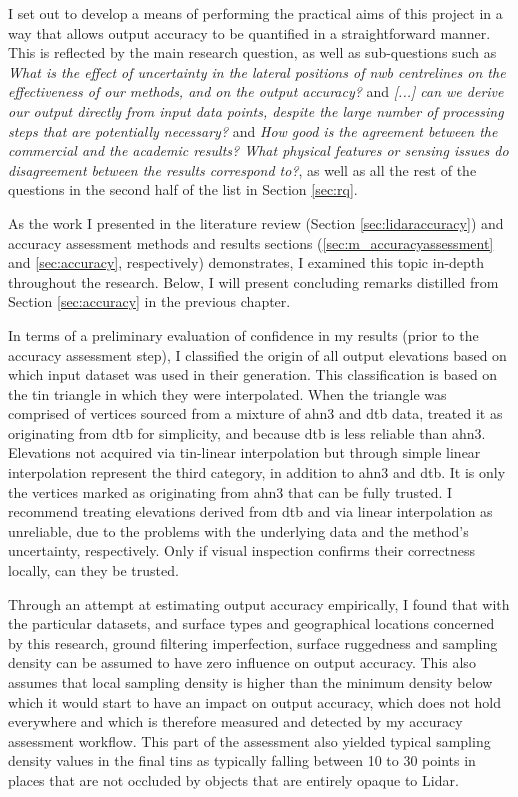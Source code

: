 I set out to develop a means of performing the practical aims of this project in a way that allows output accuracy to be quantified in a straightforward manner. This is reflected by the main research question, as well as sub-questions such as \textit{What is the effect of uncertainty in the lateral positions of \ac{nwb} centrelines on the effectiveness of our methods, and on the output accuracy?} and \textit{[...] can we derive our output directly from input data points, despite the large number of processing steps that are potentially necessary?} and \textit{How good is the agreement between the commercial and the academic results? What physical features or sensing issues do disagreement between the results correspond to?}, as well as all the rest of the questions in the second half of the list in Section \ref{sec:rq}.

As the work I presented in the literature review (Section \ref{sec:lidaraccuracy}) and accuracy assessment methods and results sections (\ref{sec:m_accuracyassessment} and \ref{sec:accuracy}, respectively) demonstrates, I examined this topic in-depth throughout the research. Below, I will present concluding remarks distilled from Section \ref{sec:accuracy} in the previous chapter.

In terms of a preliminary evaluation of confidence in my results (prior to the accuracy assessment step), I classified the origin of all output elevations based on which input dataset was used in their generation. This classification is based on the \ac{tin} triangle in which they were interpolated. When the triangle was comprised of vertices sourced from a mixture of \ac{ahn3} and \ac{dtb} data, treated it as originating from \ac{dtb} for simplicity, and because \ac{dtb} is less reliable than \ac{ahn3}. Elevations not acquired via \ac{tin}-linear interpolation but through simple linear interpolation represent the third category, in addition to \ac{ahn3} and \ac{dtb}. It is only the vertices marked as originating from \ac{ahn3} that can be fully trusted. I recommend treating elevations derived from \ac{dtb} and via linear interpolation as unreliable, due to the problems with the underlying data and the method's uncertainty, respectively. Only if visual inspection confirms their correctness locally, can they be trusted.

Through an attempt at estimating output accuracy empirically, I found that with the particular datasets, and surface types and geographical locations concerned by this research, ground filtering imperfection, surface ruggedness and sampling density can be assumed to have zero influence on output accuracy. This also assumes that local sampling density is higher than the minimum density below which it would start to have an impact on output accuracy, which does not hold everywhere and which is therefore measured and detected by my accuracy assessment workflow. This part of the assessment also yielded typical sampling density values in the final \ac{tin}s as typically falling between 10 to 30 points in places that are not occluded by objects that are entirely opaque to Lidar.

